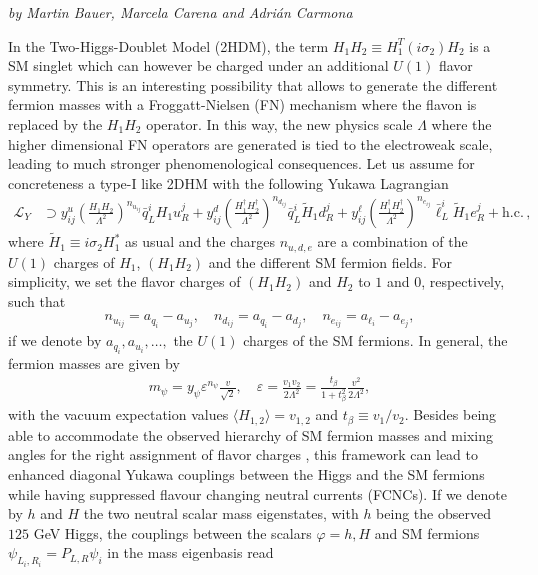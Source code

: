 \begin{center}
\textit{by Martin Bauer, Marcela Carena and Adri\'an Carmona}
\end{center}

In the Two-Higgs-Doublet Model (2HDM), the term $H_1 H_2\equiv H_1^T (i\sigma_2) H_2 $ is a SM singlet which can however be charged under an additional $U(1)$ flavor symmetry. This is an interesting possibility that allows to generate the different fermion masses with a Froggatt-Nielsen (FN) mechanism where the flavon is replaced by the $H_1 H_2$ operator. In this way, the new physics scale $\Lambda$ where the higher dimensional FN operators are generated is tied to the electroweak scale, leading to much stronger phenomenological consequences. Let us assume for concreteness a type-I like 2DHM with the following Yukawa Lagrangian 
\begin{align}
\label{eq:yuk1}
\mathcal{L}_Y&\supset  y^u_{ij} \left(\frac{H_1 H_2}{\Lambda^2}\right)^{n_{u_{ij}}}\bar{q}_L^{i}H_1 u_{R}^j+y^d_{ij} \left(\frac{H_1^{\dagger} H_2^{\dagger}}{\Lambda^2}\right)^{n_{d_{ij}}}\bar{q}_L^{i}\tilde{H}_1 d_{R}^j+y_{ij}^{\ell}\left(\frac{H_1^{\dagger}H_2^{\dagger}}{\Lambda^2}\right)^{n_{e_{ij}}}\bar{\ell}_{L}^i\tilde{H}_1 e_R^j
+\mathrm{h.c.}\,,
\end{align}
where $\tilde{H}_1\equiv i\sigma_2 H^{\ast}_1$ as usual and the charges $n_{u,d,e}$ are a combination of the $U(1)$ charges of $H_1$, $(H_1H_2)$ and the different SM fermion fields. For simplicity, we set the flavor charges of $(H_1 H_2)$ and $H_2$ to $1$ and $0$, respectively, such that  
\begin{align}
n_{u_{ij}}=a_{q_i}-a_{u_j},\quad n_{d_{ij}}=a_{q_i}-a_{d_j},\quad n_{e_{ij}}=a_{\ell_i}-a_{e_j},
\end{align}
if we denote by $a_{q_i},a_{u_i}, \ldots,$ the $U(1)$ charges of the SM fermions. In general, the fermion masses are given by
\begin{align}\label{eq:epsilon}
m_\psi=y_{\psi} \varepsilon^{n_\psi} \frac{v}{\sqrt{2}}, \quad \varepsilon = \frac{v_1 v_2}{2\Lambda^2}=\frac{t_\beta}{1+t_\beta^2}\frac{v^2}{2\Lambda^2},
\end{align}
with the vacuum expectation values $\langle H_{1, 2}\rangle=v_{1, 2}$ and $t_\beta \equiv v_1/v_2$. Besides being able to accommodate the observed hierarchy of SM fermion masses and mixing angles for the right assignment of flavor charges \cite{Bauer:2015fxa, Bauer:2015kzy}, this framework can lead to enhanced diagonal Yukawa couplings between the Higgs and the SM fermions while having suppressed flavour changing neutral currents (FCNCs). If we denote by $h$ and $H$ the two neutral scalar mass eigenstates, with $h$ being the observed $125$ GeV Higgs, the couplings between the scalars $\varphi=h,H$ and SM fermions $\psi_{L_i, R_i}= P_{L,R} \psi_i$ in the mass eigenbasis read 
